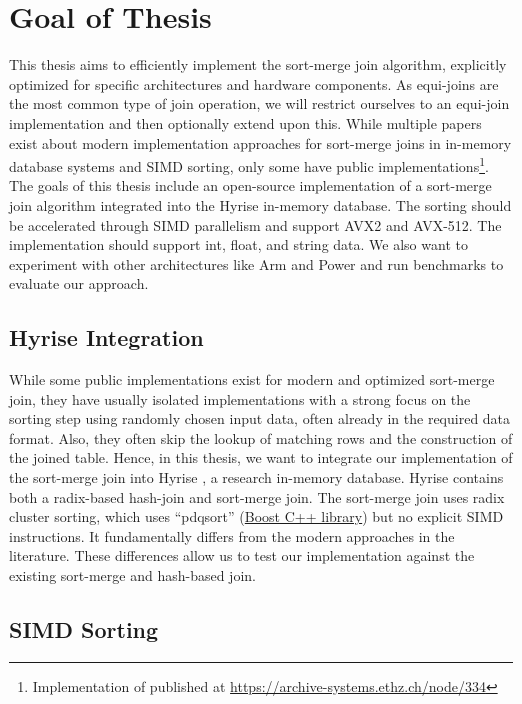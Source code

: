 \section{Goal of Thesis}
\label{sec:goal}

This thesis aims to efficiently implement the sort-merge join algorithm, explicitly optimized 
for specific architectures and hardware components. As equi-joins are the most common type of 
join operation, we will restrict ourselves to an equi-join implementation and then optionally
extend upon this. While multiple papers exist about modern implementation approaches for
sort-merge joins in in-memory database systems and SIMD sorting, only some have public 
implementations\footnote{Implementation of \cite{Balkesen} published at \url{https://archive-systems.ethz.ch/node/334}}.
The goals of this thesis include an open-source implementation of a sort-merge join algorithm
integrated into the Hyrise in-memory database. The sorting should be accelerated through SIMD
parallelism and support AVX2 and AVX-512. The implementation should support int, float, and string
data. We also want to experiment with other architectures like Arm and Power and run benchmarks 
to evaluate our approach.

\subsection{Hyrise Integration}
While some public implementations
exist for modern and optimized sort-merge join, they have usually isolated implementations with a strong
focus on the sorting step using randomly chosen input data, often already in the required data format. 
Also, they often skip the lookup of matching rows and the construction of the joined table.
Hence, in this thesis, we want to integrate our implementation of the sort-merge join into Hyrise
\cite{DBLP:conf/edbt/DreselerK0KUP19},
a research in-memory database. Hyrise contains both a radix-based hash-join and sort-merge join.
The sort-merge join uses radix cluster sorting, which uses ``pdqsort'' (\href{https://www.boost.org/}{Boost C++ library})
but no explicit SIMD instructions. It fundamentally differs from the modern approaches in the literature.
These differences allow us to test our implementation against the existing sort-merge and hash-based join.

\subsection{SIMD Sorting}


